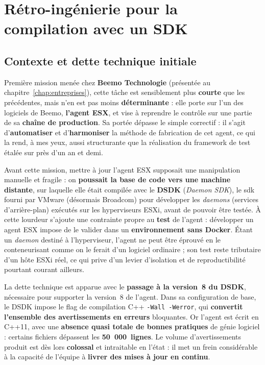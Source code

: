 \section{Rétro-ingénierie pour la compilation avec un SDK}
\label{chap:t6}

\subsection{Contexte et dette technique initiale}
Première mission menée chez \textbf{Beemo Technologie} (présentée au
chapitre~\ref{chap:entreprises}), cette tâche est sensiblement plus
\textbf{courte} que les précédentes, mais n'en est pas moins
\textbf{déterminante} : elle porte sur l'un des logiciels de Beemo,
\textbf{l'agent ESX}, et vise à reprendre le contrôle sur une partie de sa
\textbf{chaîne de production}. Sa portée dépasse le simple correctif : il s'agit
d'\textbf{automatiser} et d'\textbf{harmoniser} la méthode de fabrication de cet
agent, ce qui la rend, à mes yeux, aussi structurante que la réalisation du
framework de test étalée sur près d'un an et demi.

Avant cette mission, mettre à jour l'agent ESX supposait une manipulation
manuelle et fragile : on \textbf{poussait la base de code vers une machine
distante}, sur laquelle elle était compilée avec le \textbf{DSDK}
(\emph{Daemon SDK}), le \gls{sdk} fourni par VMware (désormais Broadcom) pour
développer les \emph{daemons} (services d'arrière-plan) exécutés sur les
hyperviseurs ESXi, avant de pouvoir être testée. À cette lourdeur s'ajoute une
contrainte propre au \textbf{test} de l'agent : développer un agent ESX impose
de le valider dans un \textbf{environnement sans Docker}. Étant un \emph{daemon}
destiné à l'hyperviseur, l'agent ne peut être éprouvé en le conteneurisant comme
on le ferait d'un logiciel ordinaire ; son test reste tributaire d'un
hôte ESXi réel, ce qui prive d'un levier d'isolation et de reproductibilité
pourtant courant ailleurs.

La dette technique est apparue avec le \textbf{passage à la version~8 du DSDK},
nécessaire pour supporter la version~8 de l'agent. Dans sa configuration de
base, le DSDK impose le flag de compilation C++ \texttt{-Wall -Werror}, qui
\textbf{convertit l'ensemble des avertissements en erreurs} bloquantes. Or
l'agent est écrit en C++11, avec une \textbf{absence quasi totale de bonnes
pratiques} de génie logiciel : certains fichiers dépassent les
\textbf{50~000~lignes}. Le volume d'avertissements produit est dès lors
\textbf{colossal} et intraitable en l'état : il met un frein considérable à la
capacité de l'équipe à \textbf{livrer des mises à jour en continu}.

